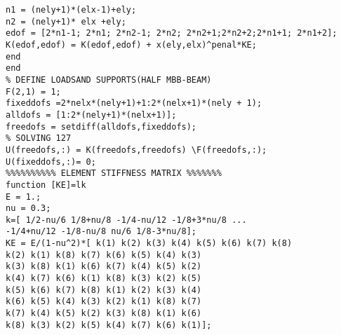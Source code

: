 \documentclass{article}
\begin{document}
\begin{verbatim}
n1 = (nely+1)*(elx-1)+ely;
n2 = (nely+1)* elx +ely;
edof = [2*n1-1; 2*n1; 2*n2-1; 2*n2; 2*n2+1;2*n2+2;2*n1+1; 2*n1+2];
K(edof,edof) = K(edof,edof) + x(ely,elx)^penal*KE;
end
end
% DEFINE LOADSAND SUPPORTS(HALF MBB-BEAM)
F(2,1) = 1;
fixeddofs =2*nelx*(nely+1)+1:2*(nelx+1)*(nely + 1);
alldofs = [1:2*(nely+1)*(nelx+1)];
freedofs = setdiff(alldofs,fixeddofs);
% SOLVING 127
U(freedofs,:) = K(freedofs,freedofs) \F(freedofs,:);
U(fixeddofs,:)= 0;
%%%%%%%%%% ELEMENT STIFFNESS MATRIX %%%%%%%
function [KE]=lk
E = 1.;
nu = 0.3;
k=[ 1/2-nu/6 1/8+nu/8 -1/4-nu/12 -1/8+3*nu/8 ...
-1/4+nu/12 -1/8-nu/8 nu/6 1/8-3*nu/8];
KE = E/(1-nu^2)*[ k(1) k(2) k(3) k(4) k(5) k(6) k(7) k(8)
k(2) k(1) k(8) k(7) k(6) k(5) k(4) k(3)
k(3) k(8) k(1) k(6) k(7) k(4) k(5) k(2)
k(4) k(7) k(6) k(1) k(8) k(3) k(2) k(5)
k(5) k(6) k(7) k(8) k(1) k(2) k(3) k(4)
k(6) k(5) k(4) k(3) k(2) k(1) k(8) k(7)
k(7) k(4) k(5) k(2) k(3) k(8) k(1) k(6)
k(8) k(3) k(2) k(5) k(4) k(7) k(6) k(1)];


\end{verbatim}
\end{document}
